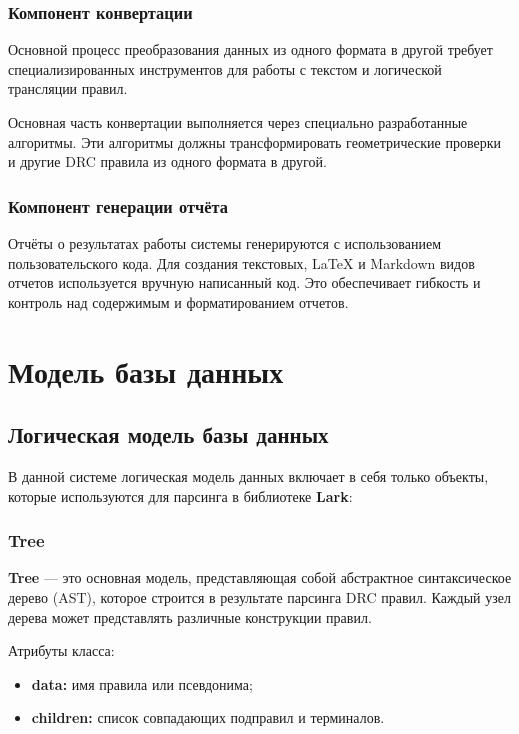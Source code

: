 \subsubsection{Компонент конвертации}

Основной процесс преобразования данных из одного формата в другой
требует специализированных инструментов
для работы с текстом и логической трансляции правил.\par
Основная часть конвертации выполняется
через специально разработанные алгоритмы.
Эти алгоритмы должны трансформировать геометрические проверки
и другие DRC правила из одного формата в другой.

\subsubsection{Компонент генерации отчёта}

Отчёты о результатах работы системы генерируются
с использованием пользовательского кода.
Для создания текстовых, LaTeX и Markdown видов отчетов используется
вручную написанный код.
Это обеспечивает гибкость и контроль над содержимым и форматированием отчетов.

\section{Модель базы данных}

\subsection{Логическая модель базы данных}

В данной системе логическая модель данных включает в себя только объекты,
которые используются для парсинга в библиотеке \textbf{Lark}:

\subsubsection{Tree}

\textbf{Tree} --- это основная модель,
представляющая собой абстрактное синтаксическое дерево (AST),
которое строится в результате парсинга DRC правил.
Каждый узел дерева может представлять различные конструкции правил.

Атрибуты класса:

\begin{itemize}
	\item \textbf{data:} имя правила или псевдонима;
	\item \textbf{children:} список совпадающих подправил и терминалов.
\end{itemize}

